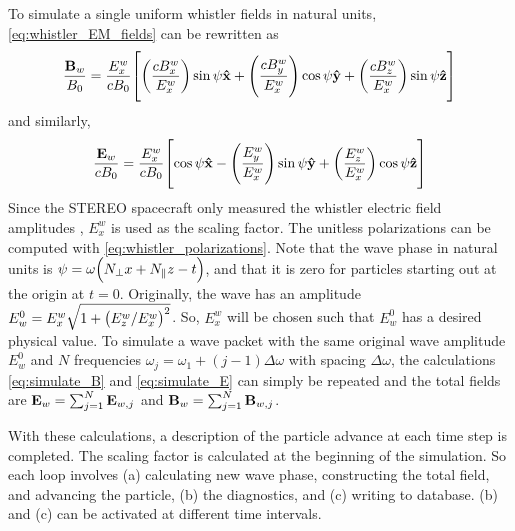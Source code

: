 To simulate a single uniform whistler fields in natural units,
\cref{eq:whistler_EM_fields} can be rewritten as
\begin{equation}\label{eq:simulate_B}
    \frac{\vb{B}_w}{B_0}=\frac{E_x^w}{cB_0}\qty[\qty(\frac{cB_x^w}{E_x^w})\sin\psi\vb{\hat{x}}+\qty(\frac{cB_y^w}{E_x^w})\cos\psi\vb{\hat{y}}+\qty(\frac{cB_z^w}{E_x^w})\sin\psi\vb{\hat{z}}]
\end{equation}
and similarly,
\begin{equation}\label{eq:simulate_E}
    \frac{\vb{E}_w}{cB_0}=\frac{E_x^w}{cB_0}\qty[\cos\psi\vb{\hat{x}}-\qty(\frac{E_y^w}{E_x^w})\sin\psi\vb{\hat{y}}+\qty(\frac{E_z^w}{E_x^w})\cos\psi\vb{\hat{z}}]
\end{equation}
Since the STEREO spacecraft only measured the whistler electric field amplitudes
\citep{Breneman2010}, $E_x^w$ is used as
the scaling factor. The unitless polarizations can be computed with
\cref{eq:whistler_polarizations}. Note that the wave phase in natural units
is $\psi=\omega\qty(N_\perp x+N_\|z-t)$, and that it is zero for particles
starting out at the origin at $t=0$. Originally, the wave has an amplitude
$E_{w}^0=E_x^w\sqrt{1+\qty(E_z^w/E_x^w)^2}$. So, $E_x^w$ will be chosen such
that $E_{w}^0$ has a desired physical value. To simulate a wave packet with
the same original wave amplitude $E_{w}^0$ and $N$ frequencies
$\omega_j=\omega_1+(j-1)\Delta\omega$ with spacing $\Delta\omega$, the
calculations \cref{eq:simulate_B} and \cref{eq:simulate_E} can simply be
repeated and the total fields are $\vb{E}_w=\sum_{j=1}^N\vb{E}_{w,j}$ and
$\vb{B}_w=\sum_{j=1}^N\vb{B}_{w,j}$.

With these calculations, a description of the particle advance at each time step
is completed. The scaling factor is calculated at the beginning of the
simulation. So each loop involves (a) calculating new wave phase, constructing
the total field, and advancing the particle, (b) the diagnostics, and (c)
writing to database. (b) and (c) can be activated at different time intervals.

